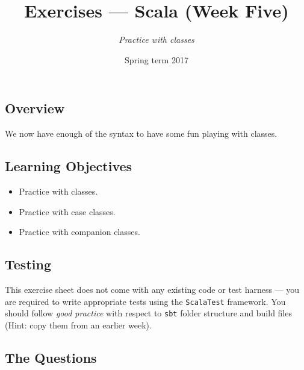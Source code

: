 \documentclass[a4paper,12pt]{exam}
\title{Exercises --- Scala (Week Five)}
\author{\emph{Practice with classes}}
\date{Spring term 2017}
\begin{document}
\maketitle

\subsection*{Overview}

We now have enough of the syntax to have some fun playing with classes. 

\subsection*{Learning Objectives}

\begin{itemize}
	\item Practice with classes.
	\item Practice with case classes.
	\item Practice with companion classes.
\end{itemize}

\subsection*{Testing}

This exercise sheet does not come with any existing code or test harness --- 
you are required to write appropriate tests using the \verb!ScalaTest! framework.
You should follow \emph{good practice} with respect to \verb!sbt! folder structure
and build files (Hint: copy them from an earlier week).

\subsection*{The Questions}
\end{document}

